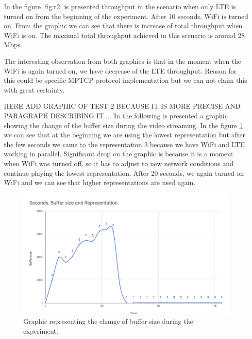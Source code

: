 \documentclass{llncs}
\begin{document}
In the figure \ref{fig:r2} is presented throughput in the scenario when only LTE is turned on from the beginning of the experiment. After 10 seconds, WiFi is turned on. From the graphic we can see that there is increase of total throughput when WiFi is on. The maximal total throughput achieved in this scenario is around 28 Mbps.

The interesting observation from both graphics is that in the moment when the WiFi is again turned on, we have decrease of the LTE throughput. Reason for this could be specific MPTCP protocol implementation but we can not claim this with great certainty.

 HERE ADD GRAPHIC OF TEST 2 BECAUSE IT IS MORE PRECISE AND PARAGRAPH DESCRIBING IT
 ...
\newpage
In the following is presented a graphic showing the change of the buffer size during the video streaming. In the figure \ref{fig:buffer2} we can see that at the beginning we are using the lowest representation but after the few seconds we came to the representation 3 because we have WiFi and LTE working in parallel. Significant drop on the graphic is because it is a moment when WiFi was turned off, so it has to adjust to new network conditions and continue playing the lowest representation. After 20 seconds, we again turned on WiFi and we can see that higher representations are used again. 

 
\begin{figure}[H]
\centering
\includegraphics[width=1.0\textwidth]{buffer-test-2.png}
\caption{\label{fig:buffer2} Graphic representing the change of buffer size during the experiment.}
\end{figure}


\end{document}
